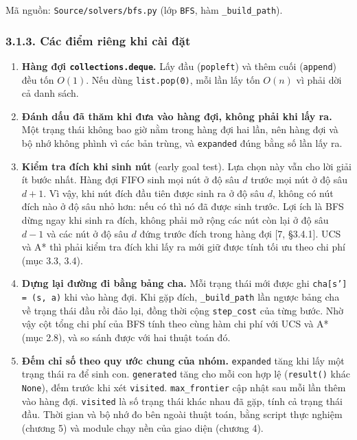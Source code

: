 Mã nguồn: \texttt{Source/\allowbreak{}solvers/\allowbreak{}bfs.\allowbreak{}py} (lớp \texttt{BFS}, hàm \texttt{\_\allowbreak{}build\_\allowbreak{}path}).

\subsubsection{3.1.3. Các điểm riêng khi cài đặt}

\begin{enumerate}
\def\labelenumi{\arabic{enumi}.}
\tightlist
\item
  \textbf{Hàng đợi \texttt{collections.\allowbreak{}deque}.} Lấy đầu (\texttt{popleft}) và thêm cuối (\texttt{append}) đều tốn \(O(1)\). Nếu dùng \texttt{list.\allowbreak{}pop(0)}, mỗi lần lấy tốn \(O(n)\) vì phải dời cả danh sách.
\item
  \textbf{Đánh dấu đã thăm khi đưa vào hàng đợi, không phải khi lấy ra.} Một trạng thái không bao giờ nằm trong hàng đợi hai lần, nên hàng đợi và bộ nhớ không phình vì các bản trùng, và \texttt{expanded} đúng bằng số lần lấy ra.
\item
  \textbf{Kiểm tra đích khi sinh nút} (early goal test). Lựa chọn này vẫn cho lời giải ít bước nhất. Hàng đợi FIFO sinh mọi nút ở độ sâu \(d\) trước mọi nút ở độ sâu \(d + 1\). Vì vậy, khi nút đích đầu tiên được sinh ra ở độ sâu \(d\), không có nút đích nào ở độ sâu nhỏ hơn: nếu có thì nó đã được sinh trước. Lợi ích là BFS dừng ngay khi sinh ra đích, không phải mở rộng các nút còn lại ở độ sâu \(d - 1\) và các nút ở độ sâu \(d\) đứng trước đích trong hàng đợi {[}7, §3.4.1{]}. UCS và A* thì phải kiểm tra đích khi lấy ra mới giữ được tính tối ưu theo chi phí (mục 3.3, 3.4).
\item
  \textbf{Dựng lại đường đi bằng bảng cha.} Mỗi trạng thái mới được ghi \texttt{cha[s'] = (s, a)} khi vào hàng đợi. Khi gặp đích, \texttt{\_\allowbreak{}build\_\allowbreak{}path} lần ngược bảng cha về trạng thái đầu rồi đảo lại, đồng thời cộng \texttt{step\_\allowbreak{}cost} của từng bước. Nhờ vậy cột tổng chi phí của BFS tính theo cùng hàm chi phí với UCS và A* (mục 2.8), và so sánh được với hai thuật toán đó.
\item
  \textbf{Đếm chỉ số theo quy ước chung của nhóm.} \texttt{expanded} tăng khi lấy một trạng thái ra để sinh con. \texttt{generated} tăng cho mỗi con hợp lệ (\texttt{result()} khác \texttt{None}), đếm trước khi xét \texttt{visited}. \texttt{max\_\allowbreak{}frontier} cập nhật sau mỗi lần thêm vào hàng đợi. \texttt{visited} là số trạng thái khác nhau đã gặp, tính cả trạng thái đầu. Thời gian và bộ nhớ đo bên ngoài thuật toán, bằng script thực nghiệm (chương 5) và module chạy nền của giao diện (chương 4).
\end{enumerate}

